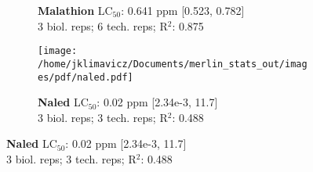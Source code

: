 \documentclass{article}
\begin{document}
\begin{figure}[thp!]
\begin{subfigure}{0.500\textwidth}
      \caption*{\textbf{Malathion} LC$_{50}$: 0.641 ppm [0.523, 0.782] \\ 
3 biol. reps; 6 tech. reps; R$^2$: 0.875}
      \vspace{0.1cm}
   \end{subfigure}%
   \begin{subfigure}{0.500\textwidth}
      \centering
      \texttt{[image: /home/jklimavicz/Documents/merlin\_stats\_out/images/pdf/naled.pdf]}
      \vspace{-0.05cm}
      \caption*{\textbf{Naled} LC$_{50}$: 0.02 ppm [2.34e-3, 11.7] \\ 
3 biol. reps; 3 tech. reps; R$^2$: 0.488}
      \vspace{0.1cm}
   \end{subfigure}%
\end{figure}
\clearpage
\pagebreak
\vspace{-0.1cm}
\end{document}
